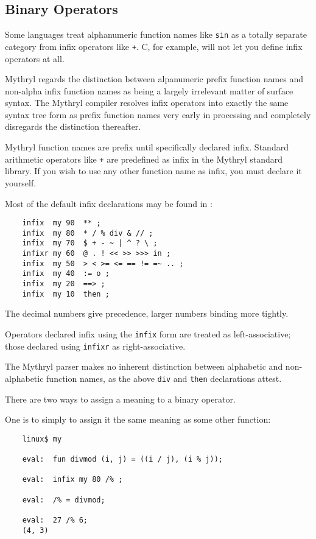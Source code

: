 \subsection{Binary Operators}
\label{section:tut:delving-deeper:binary-operators}

Some languages treat alphanumeric function names like {\tt sin} as a 
totally separate category from infix operators like {\tt +}.  C, 
for example, will not let you define infix operators at all.

Mythryl regards the distinction between alpanumeric prefix function names and non-alpha 
infix function names as being a largely irrelevant matter of surface syntax.  The 
Mythryl compiler resolves infix operators into exactly the same syntax tree form as 
prefix function names very early in processing and completely disregards the distinction 
thereafter.

Mythryl function names are prefix until specifically declared infix.  Standard 
arithmetic operators like {\tt +} are predefined as infix in the Mythryl standard 
library.  If you wish to use any other function name as infix, you must declare it 
yourself.

Most of the default infix declarations may be found in 
:
\begin{verbatim}
    infix  my 90  ** ;
    infix  my 80  * / % div & // ;
    infix  my 70  $ + - ~ | ^ ? \ ;
    infixr my 60  @ . ! << >> >>> in ;
    infix  my 50  > < >= <= == != =~ .. ;
    infix  my 40  := o ;
    infix  my 20  ==> ;
    infix  my 10  then ;
\end{verbatim}

The decimal numbers give precedence, larger numbers binding more tightly.

Operators declared infix using the {\tt infix} form are treated as 
left-associative;  those declared using {\tt infixr} as right-associative.

The Mythryl parser makes no inherent distinction between alphabetic and 
non-alphabetic function names, as the above {\tt div} and {\tt then} 
declarations attest.

There are two ways to assign a meaning to a binary operator.

One is to simply to assign it the same meaning as some other function:

\begin{verbatim}
    linux$ my

    eval:  fun divmod (i, j) = ((i / j), (i % j));

    eval:  infix my 80 /% ;

    eval:  /% = divmod;

    eval:  27 /% 6;
    (4, 3)
\end{verbatim}


